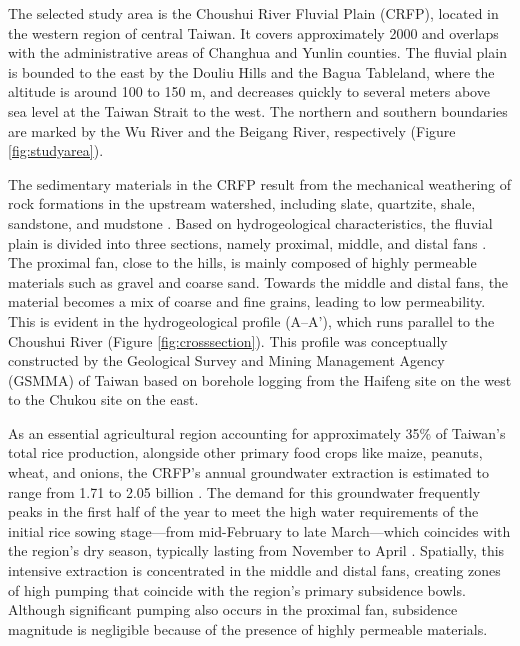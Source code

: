 
The selected study area is the Choushui River Fluvial Plain (CRFP), located in the western region of central Taiwan. It covers approximately 2000  and overlaps with the administrative areas of Changhua and Yunlin counties. The fluvial plain is bounded to the east by the Douliu Hills and the Bagua Tableland, where the altitude is around 100 to 150 m, and decreases quickly to several meters above sea level at the Taiwan Strait to the west. The northern and southern boundaries are marked by the Wu River and the Beigang River, respectively (Figure \ref{fig:studyarea}).

The sedimentary materials in the CRFP result from the mechanical weathering of rock formations in the upstream watershed, including slate, quartzite, shale, sandstone, and mudstone \citep{RN17, RN47}. Based on hydrogeological characteristics, the fluvial plain is divided into three sections, namely proximal, middle, and distal fans \citep{RN46}. The proximal fan, close to the hills, is mainly composed of highly permeable materials such as gravel and coarse sand. Towards the middle and distal fans, the material becomes a mix of coarse and fine grains, leading to low permeability. This is evident in the hydrogeological profile ($\text{A--A'}$), which runs parallel to the Choushui River (Figure \ref{fig:crosssection}). This profile was conceptually constructed by the Geological Survey and Mining Management Agency (GSMMA) of Taiwan based on borehole logging from the Haifeng site on the west to the Chukou site on the east.

As an essential agricultural region accounting for approximately 35\% of Taiwan's total rice production, alongside other primary food crops like maize, peanuts, wheat, and onions, the CRFP's annual groundwater extraction is estimated to range from 1.71 to 2.05 billion  \citet{craf_pumping}. The demand for this groundwater frequently peaks in the first half of the year to meet the high water requirements of the initial rice sowing stage—from mid-February to late March—which coincides with the region's dry season, typically lasting from November to April \citet{RN64}. Spatially, this intensive extraction is concentrated in the middle and distal fans, creating zones of high pumping that coincide with the region's primary subsidence bowls. Although significant pumping also occurs in the proximal fan, subsidence magnitude is negligible because of the presence of highly permeable materials.





